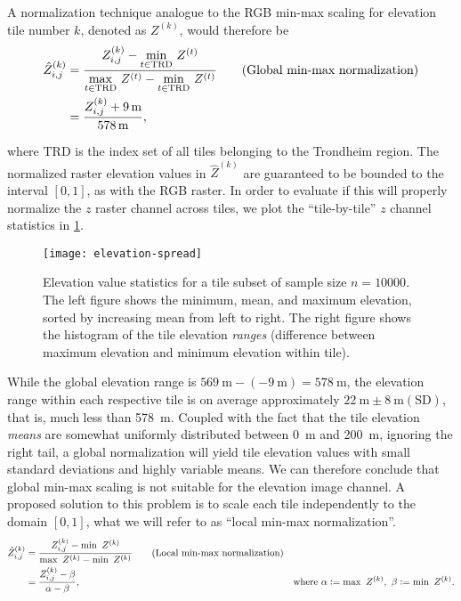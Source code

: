 A normalization technique analogue to the RGB min-max scaling for elevation tile number $k$, denoted as $Z^{(k)}$, would therefore be
\begin{align*}
  \hat{Z}_{i,j}^{(k)}
  &=
  \frac{%
    Z_{i,j}^{(k)} - \underset{t \in \mathrm{TRD}}{\min}~Z^{(t)}
  }{%
    \underset{t \in \mathrm{TRD}}{\max}~Z^{(t)} - \underset{t \in \mathrm{TRD}}{\min}~Z^{(t)}
  }
  \tag{Global min-max normalization}
  \\
  &=
  \frac{%
    Z_{i,j}^{(k)} + \SI{9}{\meter}
  }{%
    \SI{578}{\meter}
  },%
\end{align*}

where $\mathrm{TRD}$ is the index set of all tiles belonging to the Trondheim region.
The normalized raster elevation values in $\hat{Z}^{(k)}$ are guaranteed to be bounded to the interval $[0, 1]$, as with the RGB raster.
In order to evaluate if this will properly normalize the $z$ raster channel across tiles, we plot the \enquote{tile-by-tile} $z$ channel statistics in \cref{fig:elevation-spread}.

\begin{figure}[H]
  \centering
  \texttt{[image: elevation-spread]}
  \caption{%
    Elevation value statistics for a tile subset of sample size $n = \num{10000}$.
    The left figure shows the minimum, mean, and maximum elevation, sorted by increasing mean from left to right.
    The right figure shows the histogram of the tile elevation \textit{ranges} (difference between maximum elevation and minimum elevation within tile).
  }%
  \label{fig:elevation-spread}
\end{figure}

While the global elevation range is $\SI{569}{\meter} - (\SI{-9}{\meter}) = \SI{578}{\meter}$, the elevation range within each respective tile is on average approximately $\SI{22}{\meter} \pm \SI{8}{\meter} (\mathrm{SD})$, that is, much less than \SI{578}{\meter}.
Coupled with the fact that the tile elevation \textit{means} are somewhat uniformly distributed between \SI{0}{\meter} and \SI{200}{\meter}, ignoring the right tail, a global normalization will yield tile elevation values with small standard deviations and highly variable means.
We can therefore conclude that global min-max scaling is not suitable for the elevation image channel.
A proposed solution to this problem is to scale each tile independently to the domain $[0, 1]$, what we will refer to as \enquote{local min-max normalization}.
%
\begin{align*}
  \hat{Z}_{i,j}^{(k)}
  &=
  \frac{%
    Z_{i,j}^{(k)} - \min~Z^{(k)}
  }{%
    \max~Z^{(k)} - \min~Z^{(k)}
  }%
  \tag{Local min-max normalization} %
  \\
  &=
  \frac{%
    Z_{i,j}^{(k)} - \beta
  }{%
    \alpha - \beta
  },%
  &\text{where }\alpha \defeq \max~Z^{(k)},~\beta \defeq \min~Z^{(k)}.
\end{align*}

